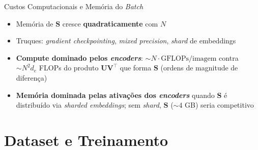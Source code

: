 \documentclass[aspectratio=169,xcolor=dvipsnames]{beamer}
\begin{document}
  \begin{frame}{Custos Computacionais e Memória do \textit{Batch}}
    \centering

    \vspace{0.5em}
    \begin{itemize}\setlength{\itemsep}{0pt}
      \item Memória de $\mathbf{S}$ cresce \textbf{quadraticamente} com $N$
      \item Truques: \textit{gradient checkpointing}, \textit{mixed precision}, \textit{shard} de embeddings
      \item \textbf{Compute dominado pelos \textit{encoders}}: $\sim N \cdot \text{GFLOPs/imagem}$ contra $\sim N^2 d_e$ FLOPs do produto $\mathbf{U} \mathbf{V}^{\top}$ que forma $\mathbf{S}$ (ordens de magnitude de diferença)
      \item \textbf{Memória dominada pelas ativações dos \textit{encoders}} quando $\mathbf{S}$ é distribuído via \textit{sharded embeddings}; sem \textit{shard}, $\mathbf{S}$ ($\sim 4$ GB) seria competitivo
    \end{itemize}
  \end{frame}

  \section{Dataset e Treinamento}
\end{document}
